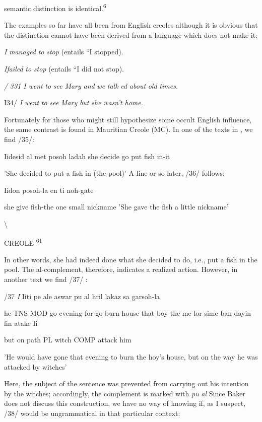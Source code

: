 semantic distinction is identical.\textsuperscript{6}

The examples so far have all been from English creoles although it is obvious that the distinction cannot have been derived from a lan\-guage which does not make it:

\ea\label{ex:31}
 \textit{I} \textit{managed} \textit{to} \textit{stop} (entails ``I stopped{\textquotedbl}).
\glt
\z

\ea\label{ex:32}
 \textit{I}\textit{failed} \textit{to} \textit{stop} (entails ``I did not stop{\textquotedbl}).
\glt
\z

\textit{/} \textit{331 I} \textit{went} \textit{to} \textit{see} \textit{Mary} \textit{and} \textit{we} \textit{talk} \textit{ed} \textit{about} \textit{old} \textit{times.}

I34/ \textit{I} \textit{went} \textit{to} \textit{see} \textit{Mary} \textit{but} \textit{she} \textit{wasn't} \textit{home.}

Fortunately for those who might still hypothesize some occult English influence, the same contrast is found in Mauritian Creole (MC). In one of the texts in \citet{Baker1972}, we find /35/:

\ea\label{ex:35}
 Iidesid al met posoh ladah she decide go put fish in-it
\glt
\z

'She decided to put a fish in (the pool)' A line or so later, /36/ follows:

\ea\label{ex:36}
 Iidon posoh-la en ti noh-gate
\glt
\z

she give fish-the one small nickname 'She gave the fish a little nickname'

{\textbackslash}

CREOLE\textsuperscript{ 61}

In other words, she had indeed done what she decided to do, i.e., put a fish in the pool. The al-complement, therefore, indicates a realized action. However, in another text we find /37/ :

/37 \textit{I }Iiti pe ale aswar pu al hril lakaz sa garsoh-la

he TNS MOD go evening for go burn house that boy-the me lor sime ban dayin fin atake Ii

but on path PL witch COMP attack him

'He would have gone that evening to burn the hoy's house, but on the way he was attacked by witches'

Here, the subject of the sentence was prevented from carrying out his intention by the witches; accordingly, the complement is marked with \textit{pu} \textit{al} Since Baker does not discuss this construction, we have no way of knowing if, as I suspect, /38/ would be ungrammatical in that particular context:

